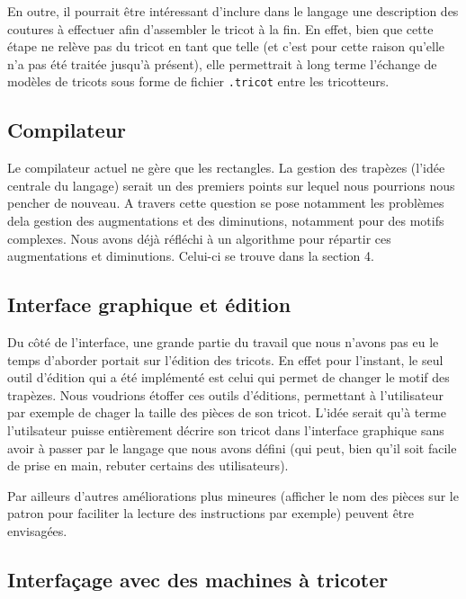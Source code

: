 \documentclass{article}
\begin{document}
En outre, il pourrait être intéressant d'inclure dans le langage une description des coutures à effectuer afin d'assembler le tricot à la fin. En effet, bien que cette étape ne relève pas du tricot en tant que telle (et c'est pour cette raison qu'elle n'a pas été traitée jusqu'à présent), elle permettrait à long terme l'échange de modèles de tricots sous forme de fichier \texttt{.tricot} entre les tricotteurs.


\subsection{Compilateur}

Le compilateur actuel ne gère que les rectangles. La gestion des trapèzes 
(l'idée centrale du langage) serait un des premiers points sur lequel nous
pourrions nous pencher de nouveau. A travers cette question se pose notamment
les problèmes dela gestion des augmentations et des diminutions, notamment pour
des motifs complexes. Nous avons déjà réfléchi à un algorithme pour répartir ces 
augmentations et diminutions. Celui-ci se trouve dans la section 4.

\subsection{Interface graphique et édition}

Du côté de l'interface, une grande partie du travail que nous n'avons
pas eu le temps d'aborder portait sur l'édition des tricots. 
En effet pour l'instant, le seul outil d'édition qui a été implémenté est celui qui permet de changer le motif des trapèzes. Nous voudrions étoffer ces outils d'éditions, permettant à l'utilisateur par exemple de chager la taille des pièces de son tricot. L'idée serait qu'à terme l'utilsateur puisse entièrement décrire son tricot dans l'interface graphique sans avoir à passer par le langage que nous avons défini (qui peut, bien qu'il soit facile de prise en main, rebuter certains des utilisateurs).

Par ailleurs d'autres améliorations plus mineures (afficher le nom des pièces sur le patron pour faciliter la lecture des instructions par exemple) peuvent être envisagées.

\subsection{Interfaçage avec des machines à tricoter}
\end{document}
